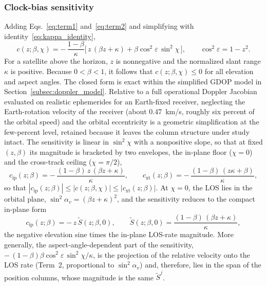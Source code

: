 \documentclass[letterpaper,times]{IONconf-v2}
\theoremstyle{plain}
\theoremstyle{remark}
\begin{document}
\subsubsection{Clock-bias sensitivity}
Adding Eqs.~\eqref{eq:term1} and~\eqref{eq:term2} and simplifying with identity~\eqref{eq:kappa_identity},
%
\begin{equation}\label{eq:coupling_analytical}
c(z;\beta,\chi) = -\,\frac{1-\beta}{\kappa}\Big[\,z\,(\beta z + \kappa) + \beta\cos^2\varepsilon\,\sin^2\chi\,\Big],
\qquad \cos^2\varepsilon = 1-z^2 .
\end{equation}
%
For a satellite above the horizon, $z$ is nonnegative and the normalized slant range $\kappa$ is positive. Because $0 < \beta < 1$, it follows that $c(z;\beta,\chi) \le 0$
for all elevation and aspect angles. The closed form is exact within the simplified GDOP model in Section~\ref{subsec:doppler_model}.
Relative to a full operational Doppler Jacobian evaluated on realistic ephemerides for an Earth-fixed receiver, neglecting the Earth-rotation velocity of the receiver (about 0.47~km/s, roughly six percent of the orbital speed) and the orbital eccentricity is a geometric simplification at the few-percent level, retained because it leaves the column structure under study intact. The sensitivity is linear in $\sin^2\chi$ with a nonpositive slope, so that at fixed $(z,\beta)$ its magnitude is bracketed by two envelopes, the in-plane floor ($\chi=0$) and the cross-track ceiling ($\chi=\pi/2$),
%
\begin{equation}\label{eq:coupling_envelopes}
c_{\mathrm{ip}}(z;\beta) = -\,\frac{(1-\beta)\,z\,(\beta z+\kappa)}{\kappa},
\qquad
c_{\mathrm{xt}}(z;\beta) = -\,\frac{(1-\beta)\,(z\kappa+\beta)}{\kappa},
\end{equation}
%
so that $|c_{\mathrm{ip}}(z;\beta)| \le |c(z;\beta,\chi)| \le |c_{\mathrm{xt}}(z;\beta)|$. At $\chi=0$, the LOS lies in the orbital plane, $\sin^2\!\alpha_v = (\beta z+\kappa)^2$, and the sensitivity reduces to the compact in-plane form
%
\begin{equation}\label{eq:c_eq_zStilde}
c_{\mathrm{ip}}(z;\beta) = -\,z\,\tilde S(z;\beta,0) , \qquad \tilde S(z;\beta,0) = \frac{(1-\beta)\,(\beta z+\kappa)}{\kappa} ,
\end{equation}
%
the negative elevation sine times the in-plane LOS-rate magnitude. More generally, the aspect-angle-dependent part of the sensitivity, $-\,(1-\beta)\beta\cos^2\varepsilon\,\sin^2\chi/\kappa$, is the projection of the relative velocity onto the LOS rate (Term~2, proportional to $\sin^2\!\alpha_v$) and, therefore, lies in the span of the position columns, whose magnitude is the same $\tilde S^j$.
\end{document}
